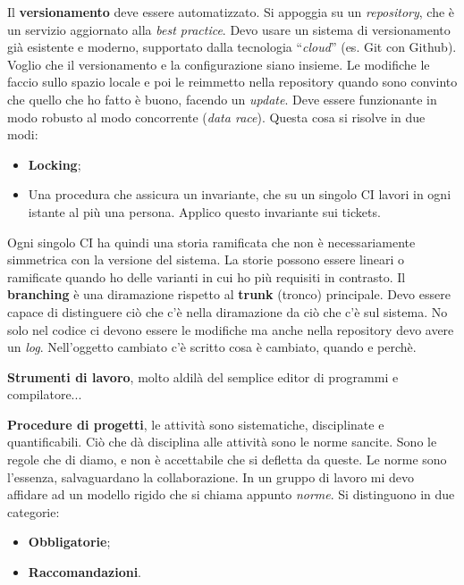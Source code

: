 Il \textbf{versionamento} deve essere automatizzato. Si appoggia su un \textit{repository}, che è un servizio aggiornato alla \textit{best practice}. Devo usare un sistema di versionamento già esistente e moderno, supportato dalla tecnologia ``\textit{cloud}'' (es. Git con Github). Voglio che il versionamento e la configurazione siano insieme. Le modifiche le faccio sullo spazio locale e poi le reimmetto nella repository quando sono convinto che quello che ho fatto è buono, facendo un \textit{update}. Deve essere funzionante in modo robusto al modo concorrente (\textit{data race}). Questa cosa si risolve in due modi:

\begin{itemize}

	\item \textbf{Locking};
	\item Una procedura che assicura un invariante, che su un singolo CI lavori in ogni istante al più una persona. Applico questo invariante sui tickets.

\end{itemize}

Ogni singolo CI ha quindi una storia ramificata che non è necessariamente simmetrica con la versione del sistema. La storie possono essere lineari o ramificate quando ho delle varianti in cui ho più requisiti in contrasto. Il \textbf{branching} è una diramazione rispetto al \textbf{trunk} (tronco) principale. Devo essere capace di distinguere ciò che c'è nella diramazione da ciò che c'è sul sistema. No solo nel codice ci devono essere le modifiche ma anche nella repository devo avere un \textit{log}. Nell'oggetto cambiato c'è scritto cosa è cambiato, quando e perchè.

\textbf{Strumenti di lavoro}, molto aldilà del semplice editor di programmi e compilatore...

\textbf{Procedure di progetti}, le attività sono sistematiche, disciplinate e quantificabili. Ciò che dà disciplina alle attività sono le norme sancite. Sono le regole che di diamo, e non è accettabile che si defletta da queste. Le norme sono l'essenza, salvaguardano la collaborazione. In un gruppo di lavoro mi devo affidare ad un modello rigido che si chiama appunto \textit{norme}. Si distinguono in due categorie:

\begin{itemize}

	\item \textbf{Obbligatorie};
	\item \textbf{Raccomandazioni}.

\end{itemize}

